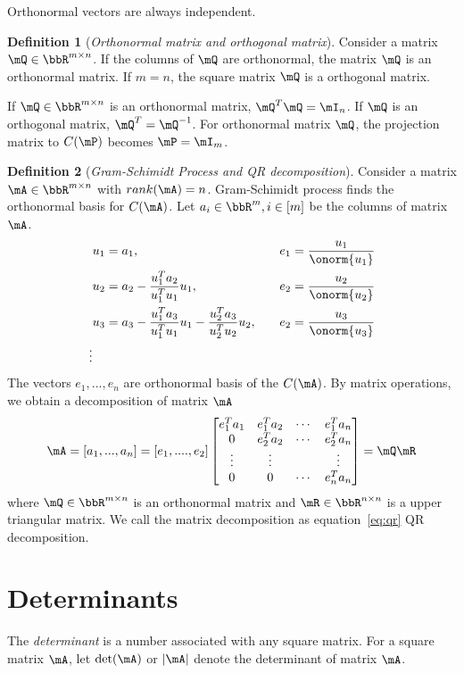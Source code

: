 \documentclass[11pt]{article}
\theoremstyle{plain}
\theoremstyle{definition}
\newtheorem{defn}{Definition}
\begin{document}
Orthonormal vectors are always independent.

\begin{defn}[\textit{Orthonormal matrix and orthogonal matrix}]\label{def:orthonom}
	Consider a matrix $\mQ \in \bbR^{m \times n}$. If the columns of $\mQ$ are orthonormal, the matrix $\mQ$ is an orthonormal matrix. If $ m= n$, the square matrix $\mQ$ is a orthogonal matrix.
\end{defn}

If $\mQ \in \bbR^{m \times n}$ is an orthonormal matrix, $\mQ^T \mQ = \mI_n$.  If $\mQ$ is an orthogonal matrix, $\mQ^T = \mQ^{-1}$.
For orthonormal matrix $\mQ$, the projection matrix to $C(\mP)$  becomes $\mP = \mI_m$.

\begin{defn}[\textit{Gram-Schimidt Process and QR decomposition}]\label{gram-schimidt}
Consider a matrix $\mA \in \bbR^{m \times n}$ with $rank(\mA) = n$. Gram-Schimidt process finds the orthonormal basis for $C(\mA)$. Let $a_i \in \bbR^{m}, i \in [m]$ be the columns of matrix $\mA$. 
\begin{align}
	&u_1 = a_1, &&\quad e_1 = \frac{u_1}{\onorm{u_1}}\\
	&u_2 = a_2 - \frac{u_1^T a_2}{u_1^T u_1} u_1 ,&&\quad  e_2 = \frac{u_2}{\onorm{u_2}}\\
	&u_3 = a_3 - \frac{u_1^T a_3}{u_1^T u_1} u_1 - \frac{u_2^T a_3}{u_2^T u_2} u_2,&&\quad  e_2 = \frac{u_3}{\onorm{u_3}}\\
	\vdots
\end{align}
 The vectors $e_1,...,e_n$ are orthonormal basis of the $C(\mA)$. By matrix operations, we obtain a decomposition of matrix $\mA$
 \begin{equation}\label{eq:qr}
 	\mA = [a_1,...,a_n] = [e_1,....,e_2] \begin{bmatrix}
 		e_1^T a_1 & e_1^T a_2 & \cdots & e_1^T a_n\\
 		0&e_2^T a_2 & \cdots & e_2^T a_n\\
 		\vdots &\vdots & & \vdots \\
 		0 &0&\cdots & e_n^T a_n
 	\end{bmatrix} = \mQ \mR
 \end{equation}
	where $\mQ \in \bbR^{m \times n}$ is an orthonormal matrix and $\mR \in \bbR^{n \times n}$ is a upper triangular matrix. We call the matrix decomposition as equation~\eqref{eq:qr} QR decomposition.
\end{defn}

\section{Determinants}
The \textit{determinant} is a number associated with any square matrix. For a square matrix $\mA$, let $\det(\mA)$ or $|\mA|$ denote the determinant of matrix $\mA$.
\end{document}
